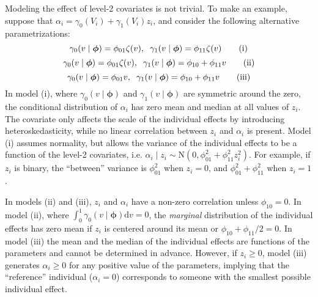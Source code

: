 \documentclass[12pt]{article}
\def\phivec{\bm{\phi}}
\begin{document}
Modeling the effect of level-2 covariates is not trivial. To make an example, suppose that 
$\alpha_i = \gamma_0(V_i) + \gamma_1(V_i)z_i$, and consider the following alternative parametrizations:
\begin{equation}
\gamma_0(v \mid \phivec) = \phi_{01}\zeta(v), \hspace{0.2cm} \gamma_1(v \mid \phivec) = \phi_{11}\zeta(v)\tag{i}
\end{equation}
\begin{equation}
\gamma_0(v \mid \phivec) = \phi_{01}\zeta(v), \hspace{0.2cm} \gamma_1(v \mid \phivec) = \phi_{10} + \phi_{11}v \tag{ii}\\
\end{equation}
\begin{equation}
\gamma_0(v \mid \phivec) = \phi_{01}v, \hspace{0.2cm} \gamma_1(v \mid \phivec) = \phi_{10} + \phi_{11}v \tag{iii}\\
\end{equation}
In model (i), where $\gamma_0(v \mid \phivec)$ and $\gamma_1(v \mid \phivec)$ are symmetric around the zero,
the conditional distribution of $\alpha_i$ has zero mean and median at all values of $z_i$. The covariate only affects
the scale of the individual effects by introducing heteroskedasticity, while no linear correlation between $z_i$ and $\alpha_i$ is present. 
Model (i) assumes normality, but allows the variance of the individual effects to be a function of the level-2 covariates, i.e. $\alpha_i \mid z_i \sim \text{N}(0, \phi_{01}^2 + \phi_{11}^2 z_i^2)$.
For example, if $z_i$ is binary, the ``between'' variance is $\phi_{01}^2$ when $z_i = 0$, and $\phi_{01}^2 + \phi_{11}^2$ when $z_i = 1$.

In models (ii) and (iii), $z_i$ and $\alpha_i$ have a non-zero correlation unless $\phi_{10} = 0$.
In model (ii), where $\int_0^1\gamma_0(v \mid \phivec) \mathrm{d}v = 0$, the \textit{marginal} distribution of the individual 
effects has zero mean if $z_i$ is centered around its mean or $\phi_{10} + \phi_{11}/2 = 0$. In model (iii) the mean and the median
of the individual effects are functions of the parameters and cannot be determined in advance.  
However, if $z_i \ge 0$, model (iii) generates $\alpha_i \ge 0$ for any positive value of the parameters,
implying that the ``reference'' individual ($\alpha_i = 0$) corresponds to 
someone with the smallest possible individual effect.
\end{document}
